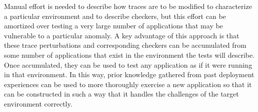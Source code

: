 Manual effort is needed to describe how traces are to be modified to characterize a particular environment and to describe checkers, but this effort can be amortized over testing a very large number of applications that may be vulnerable to a particular anomaly.
%
%
%
A key advantage of this approach is that these %
trace perturbations and corresponding checkers can be
accumulated from some number of applications that exist in the environment the tests will describe.  Once accumulated,
they can be used to test any application as if it were running in that environment.  In this way, prior knowledge
gathered from past deployment experiences can be used to more thoroughly exercise a new application so that it can be
constructed in such a way that it handles the challenges of the target environment correctly.

